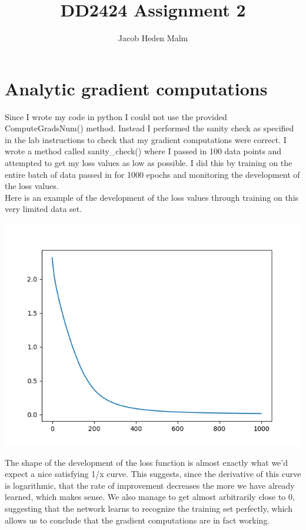 \documentclass[11pt,a4paper]{article}
\author{Jacob Heden Malm}
\title{DD2424 Assignment 2}
\begin{document}
\maketitle

\section{Analytic gradient computations}
Since I wrote my code in python I could not use the provided ComputeGradsNum() method. Instead I performed the sanity check as specified in the lab instructions to check that my gradient computations were correct. I wrote a method called sanity\_check() where I passed in 100 data points and attempted to get my loss values as low as possible. I did this by training on the entire batch of data passed in for 1000 epochs and monitoring the development of the loss values.\\

Here is an example of the development of the loss values through training on this very limited data set.

\includegraphics[width=\textwidth]{sanity_check.png}

The shape of the development of the loss function is almost exactly what we'd expect a nice satisfying 1/x curve. This suggests, since the derivative of this curve is logarithmic, that the rate of improvement decreases the more we have already learned, which makes sense. We also manage to get almost arbitrarily close to 0, suggesting that the network learns to recognize the training set perfectly, which allows us to conclude that the gradient computations are in fact working.
\end{document}
